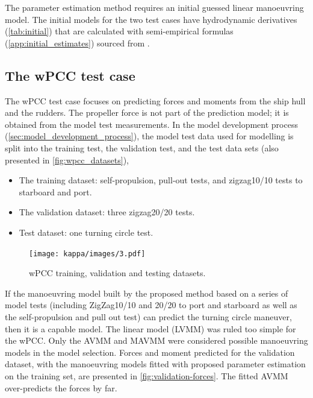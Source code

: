 


\noindent The parameter estimation method requires an initial guessed linear manoeuvring model. The initial models for the two test cases have hydrodynamic derivatives (\autoref{tab:initial}) that are calculated with semi-empirical formulas (\autoref{app:initial_estimates}) sourced from \textcite{brix_manoeuvring_1993}. 

\clearpage
\subsection{The wPCC test case}
\label{\detokenize{05.01_case_studies:the-wpcc-test-scenarios}}
The wPCC test case focuses on predicting forces and moments from the ship hull and the rudders. The propeller force is not part of the prediction model; it is obtained from the model test measurements.
In the model development process (\autoref{sec:model_development_process}), the model test data used for modelling is split into the training test, the validation test, and the test data sets (also presented in \autoref{fig:wpcc_datasets}), 
\vspace{5pt}
\begin{itemize}
    \setlength\itemsep{5pt}
    \item The training dataset: self-propulsion, pull-out tests, and zigzag10/10 tests to starboard and port.
    \item The validation dataset: three zigzag20/20 tests.
    \item Test dataset: one turning circle test.
\end{itemize}
\begin{figure}[h!]
\centering
\texttt{[image: kappa/images/3.pdf]}
\caption{wPCC training, validation and testing datasets.}
\label{fig:wpcc_datasets}
\end{figure}
\noindent If the manoeuvring model built by the proposed method based on a series of model tests (including ZigZag10/10 and 20/20 to port and starboard as well as the self-propulsion and pull out test) \cite{imo_standards_2002} can predict the turning circle maneuver, then it is a capable model. The linear model (LVMM) was ruled too simple for the wPCC. Only the AVMM and MAVMM were considered possible manoeuvring models in the model selection.
Forces and moment predicted for the validation dataset, with the manoeuvring models fitted with proposed parameter estimation on the training set, are presented in \autoref{fig:validation-forces}. The fitted AVMM over-predicts the forces by far. 
